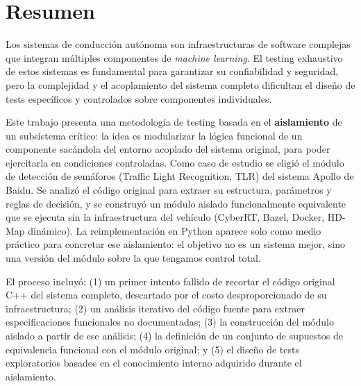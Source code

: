\documentclass[a4paper,12pt]{report}
\begin{document}
\thispagestyle{empty}

\maketitle
\newpage


\thispagestyle{empty}
\chapter*{Resumen}

Los sistemas de conducción autónoma son infraestructuras de software complejas que integran múltiples componentes de \textit{machine learning}. El testing exhaustivo de estos sistemas es fundamental para garantizar su confiabilidad y seguridad, pero la complejidad y el acoplamiento del sistema completo dificultan el diseño de tests específicos y controlados sobre componentes individuales.

Este trabajo presenta una metodología de testing basada en el \textbf{aislamiento} de un subsistema crítico: la idea es modularizar la lógica funcional de un componente sacándola del entorno acoplado del sistema original, para poder ejercitarla en condiciones controladas. Como caso de estudio se eligió el módulo de detección de semáforos (Traffic Light Recognition, TLR) del sistema Apollo de Baidu. Se analizó el código original para extraer su estructura, parámetros y reglas de decisión, y se construyó un módulo aislado funcionalmente equivalente que se ejecuta sin la infraestructura del vehículo (CyberRT, Bazel, Docker, HD-Map dinámico). La reimplementación en Python aparece solo como medio práctico para concretar ese aislamiento: el objetivo no es un sistema mejor, sino una versión del módulo sobre la que tengamos control total.

El proceso incluyó: (1) un primer intento fallido de recortar el código original C++ del sistema completo, descartado por el costo desproporcionado de su infraestructura; (2) un análisis iterativo del código fuente para extraer especificaciones funcionales no documentadas; (3) la construcción del módulo aislado a partir de ese análisis; (4) la definición de un conjunto de supuestos de equivalencia funcional con el módulo original; y (5) el diseño de tests exploratorios basados en el conocimiento interno adquirido durante el aislamiento.
\end{document}
